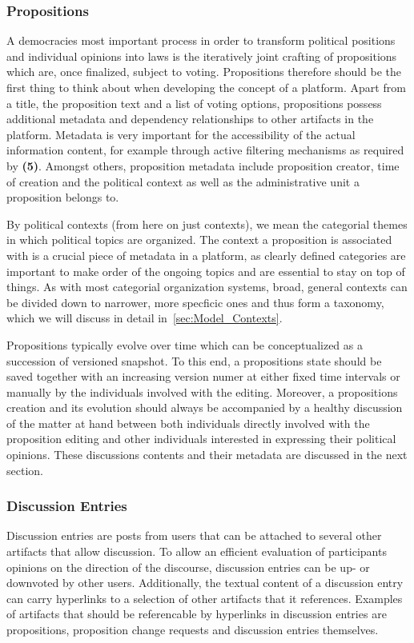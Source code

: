\subsubsection{Propositions}
\label{sec:Model_Propositions}
A democracies most important process in order to transform political positions and individual opinions into laws is the iteratively joint crafting of propositions which are, once finalized, subject to voting.
Propositions therefore should be the first thing to think about when developing the concept of a  platform.
Apart from a title, the proposition text and a list of voting options, propositions possess additional metadata and dependency relationships to other artifacts in the platform.
Metadata is very important for the accessibility of the actual information content, for example through active filtering mechanisms as required by \textbf{(5)}.
Amongst others, proposition metadata include proposition creator, time of creation and the political context as well as the administrative unit a proposition belongs to.

By political contexts (from here on just contexts), we mean the categorial themes in which political topics are organized.
The context a proposition is associated with is a crucial piece of metadata in a  platform, as  clearly defined categories are important to make order of the ongoing topics and are essential to stay on top of things.
As with most categorial organization systems, broad, general contexts can be divided down to narrower, more specficic ones and thus form a taxonomy, which we will discuss in detail in~\ref{sec:Model_Contexts}.

Propositions typically evolve over time which can be conceptualized as a succession of versioned snapshot.
To this end, a propositions state should be saved together with an increasing version numer at either fixed time intervals or manually by the individuals involved with the editing.
Moreover, a propositions creation and its evolution should always be accompanied by a healthy discussion of the matter at hand between both individuals directly involved with the proposition editing and other individuals interested in expressing their political opinions.
These discussions contents and their metadata are discussed in the next section.

\subsubsection{Discussion Entries}
\label{ssec:Discussion_Entries}
Discussion entries are posts from users that can be attached to several other artifacts that allow discussion.
To allow an efficient evaluation of participants opinions on the direction of the discourse, discussion entries can be up- or downvoted by other users.
Additionally, the textual content of a discussion entry can carry hyperlinks to a selection of other artifacts that it references.
Examples of artifacts that should be referencable by hyperlinks in discussion entries are propositions, proposition change requests and discussion entries themselves.

